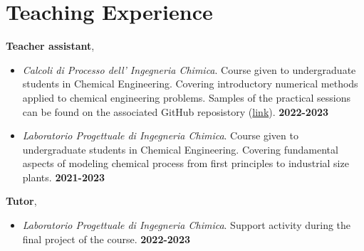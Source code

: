 \section{\sc Teaching Experience}

{\bf Teacher assistant}, \polimi
\vspace*{.05in}
\begin{itemize}
    \item[ ] {\it Calcoli di Processo dell' Ingegneria Chimica}. Course given to
       undergraduate students in Chemical Engineering. Covering introductory numerical
       methods applied to chemical engineering problems. Samples of the practical sessions
       can be found on the associated GitHub reposistory
        (\href{https://github.com/Titodinelli/Calcoli-di-Processo-dell-Ingegneria-Chimica}{link}).
        \hfill {\bf 2022-2023}

    \item[ ] {\it Laboratorio Progettuale di Ingegneria Chimica}. Course given to undergraduate
        students in Chemical Engineering. Covering fundamental aspects of modeling chemical process
        from first principles to industrial size plants. \hfill {\bf 2021-2023}
\end{itemize}

{\bf Tutor}, \polimi
\vspace*{.05in}
\begin{itemize}
    \item[ ] {\it Laboratorio Progettuale di Ingegneria Chimica}. Support activity during the
        final project of the course. \hfill {\bf 2022-2023}
\end{itemize}
